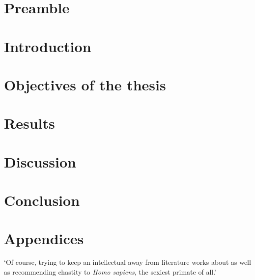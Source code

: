 \documentclass[a4paper,twoside]{ociamthesis}
\begin{document}
\flushbottom
\part*{Preamble}

\part{Introduction}
\label{part:introduction}




\part{Objectives of the thesis}
\label{part:objectives}

\part{Results}
\label{part:results}




\part{Discussion}
\label{part:discussion}


\part*{Conclusion}




\cleardoublepage{}
\startappendices
\part*{Appendices}






\setlength{\baselineskip}{0pt} %

\renewcommand{\bibname}{References}

\begin{savequote}[8cm]

	‘Of course, trying to keep an intellectual away from literature works about as well as recommending chastity to \textit{Homo sapiens}, the sexiest primate of all.’
\end{savequote}
\end{document}
